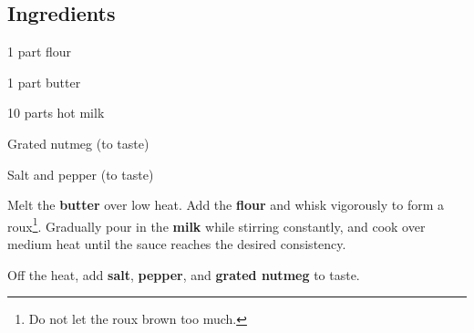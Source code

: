 \newpage
{}
\label{sauce_bechamel}

\subsection*{Ingredients}
\begin{ingredients}
	\item 1 part flour
	\item 1 part butter
	\item 10 parts hot milk
	\item Grated nutmeg (to taste)
	\item Salt and pepper (to taste)
\end{ingredients}

\medskip

Melt the \textbf{butter} over low heat.
Add the \textbf{flour} and whisk vigorously to form a roux\footnote{Do not let the roux brown too much.}. 
Gradually pour in the \textbf{milk} while stirring constantly, and cook over medium heat until the sauce reaches the desired consistency. 

Off the heat, add \textbf{salt}, \textbf{pepper}, and \textbf{grated nutmeg} to taste. 

\vspace*{0.75 cm}

\begin{recipeblock}
	
\end{recipeblock}